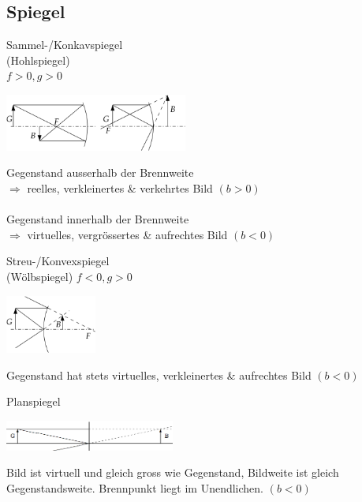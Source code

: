 \subsection{Spiegel  }
\begin{minipage}[]{4cm}
  Sammel-/Konkavspiegel\\
  (Hohlspiegel)\\
  $f>0, g>0$
\end{minipage}
\begin{minipage}[]{6.5cm}
  \includegraphics[width=6cm]{./bilder/Konkavspiegel.png}
\end{minipage}
\begin{minipage}[]{8cm}
  \small
  Gegenstand ausserhalb der Brennweite \\
  $\Rightarrow$ reelles, verkleinertes \& verkehrtes Bild $(b>0)$\\ \\
  Gegenstand innerhalb der Brennweite \\
  $\Rightarrow$ virtuelles, vergrössertes \& aufrechtes Bild $(b<0)$
\end{minipage}

\begin{minipage}[]{3.5cm}
  Streu-/Konvexspiegel\\
  (Wölbspiegel)
  $f<0, g>0$
\end{minipage}
\begin{minipage}[]{7cm}
  \includegraphics[width=3cm]{./bilder/Konvexspiegel.png}
\end{minipage}
\begin{minipage}[]{8cm}
  \small
  Gegenstand hat stets virtuelles, verkleinertes \& aufrechtes Bild $(b<0)$
\end{minipage}

\begin{minipage}[]{3.5cm}
  Planspiegel
\end{minipage}
\begin{minipage}[]{7cm}
  \includegraphics[height=1cm]{./bilder/Planspiegel.png}
\end{minipage}
\begin{minipage}[]{8cm}
  \small
  Bild ist virtuell und gleich gross wie Gegenstand, Bildweite ist gleich
  Gegenstandsweite. Brennpunkt liegt im Unendlichen. $(b<0)$
\end{minipage}

